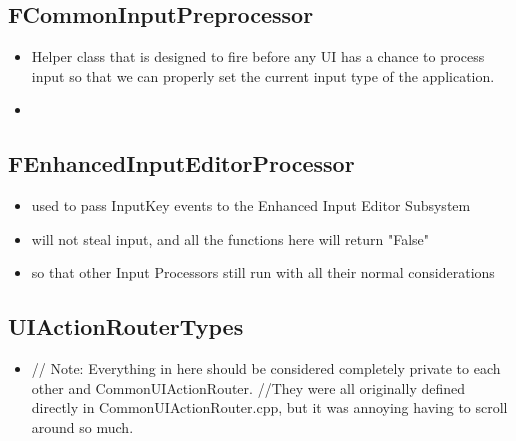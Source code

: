         \subsection{FCommonInputPreprocessor}
            \begin{itemize}
                \item Helper class that is designed to fire before any UI has a chance to process input so that we can properly set the current input type of the application.
                \item 
            \end{itemize}

        \subsection{FEnhancedInputEditorProcessor}
            \begin{itemize}
                \item used to pass InputKey events to the Enhanced Input Editor Subsystem
                \item will not steal input, and all the functions here will return "False"
                \item so that other Input Processors still run with all their normal considerations
            \end{itemize}

        
        \subsection{UIActionRouterTypes}
            \begin{itemize}
                \item // Note: Everything in here should be considered completely private to each other and CommonUIActionRouter.
                //They were all originally defined directly in CommonUIActionRouter.cpp, but it was annoying having to scroll around so much.
            \end{itemize}


